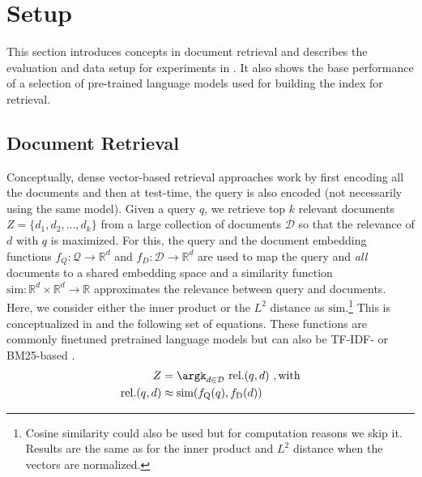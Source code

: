

\clearpage

\section{Setup} \label{sec:intro_setup}

This section introduces concepts in document retrieval and describes the evaluation and data setup for experiments in .
It also shows the base performance of a selection of pre-trained language models used for building the index for retrieval.

\subsection{Document Retrieval}

Conceptually, dense vector-based retrieval approaches work by first encoding all the documents and then at test-time, the query is also encoded (not necessarily using the same model).
Given a query $q$, we retrieve top $k$ relevant documents $Z = \{d_1, d_2, \ldots, d_k\}$ from a large collection of documents $\mathcal{D}$ so that the relevance of $d$ with $q$ is maximized.
For this, the query and the document embedding functions $f_Q : \mathcal{Q} \rightarrow \mathbb{R}^d$ and $f_D : \mathcal{D} \rightarrow \mathbb{R}^d$ are used to map the query and \textit{all} documents to a shared embedding space and a similarity function $\text{sim} : \mathbb{R}^d \times \mathbb{R}^d \rightarrow \mathbb{R}$ approximates the relevance between query and documents.
Here, we consider either the inner product or the $L^2$ distance as $\text{sim}$.\footnote{Cosine similarity could also be used but for computation reasons we skip it.
    Results are the same as for the inner product and $L^2$ distance when the vectors are normalized.}
This is conceptualized in  and the following set of equations.
These functions are commonly finetuned pretrained language models \citep{kim2019qe,kwiatkowski2019natural,reimers2019sentence,karpukhin2020dense} but can also be TF-IDF- or BM25-based \citep{robertson1995okapi}.
\begin{align*}
    Z                 & = \argk_{d \in \mathcal{D}}~ \text{rel.}(q, d)~, \text{with} \\
    \text{rel.}(q, d) & \approx \text{sim}(f_\text{Q}(q), f_\text{D}(d))
\end{align*}

